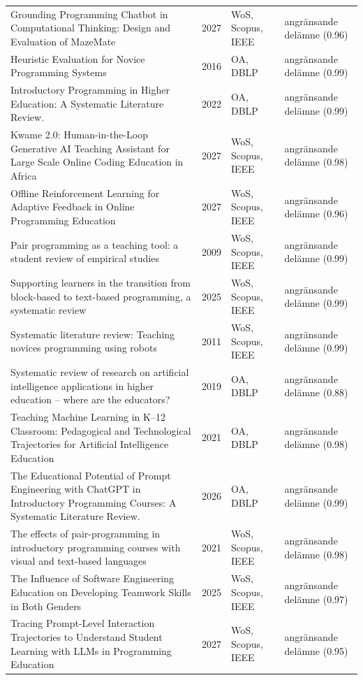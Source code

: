 \begin{longtable}{@{}%
  >{\raggedright\arraybackslash}p{}c%
  >{\raggedright\arraybackslash}p{}%
  >{\raggedright\arraybackslash}p{}@{}}
Grounding Programming Chatbot in Computational Thinking: Design and Evaluation of MazeMate & 2027 & WoS, Scopus, IEEE & angränsande delämne (0.96) \\
Heuristic Evaluation for Novice Programming Systems & 2016 & OA, DBLP & angränsande delämne (0.99) \\
Introductory Programming in Higher Education: A Systematic Literature Review. & 2022 & OA, DBLP & angränsande delämne (0.99) \\
Kwame 2.0: Human-in-the-Loop Generative AI Teaching Assistant for Large Scale Online Coding Education in Africa & 2027 & WoS, Scopus, IEEE & angränsande delämne (0.98) \\
Offline Reinforcement Learning for Adaptive Feedback in Online Programming Education & 2027 & WoS, Scopus, IEEE & angränsande delämne (0.96) \\
Pair programming as a teaching tool: a student review of empirical studies & 2009 & WoS, Scopus, IEEE & angränsande delämne (0.99) \\
Supporting learners in the transition from block-based to text-based programming, a systematic review & 2025 & WoS, Scopus, IEEE & angränsande delämne (0.99) \\
Systematic literature review: Teaching novices programming using robots & 2011 & WoS, Scopus, IEEE & angränsande delämne (0.99) \\
Systematic review of research on artificial intelligence applications in higher education -- where are the educators? & 2019 & OA, DBLP & angränsande delämne (0.88) \\
Teaching Machine Learning in K--12 Classroom: Pedagogical and Technological Trajectories for Artificial Intelligence Education & 2021 & OA, DBLP & angränsande delämne (0.98) \\
The Educational Potential of Prompt Engineering with ChatGPT in Introductory Programming Courses: A Systematic Literature Review. & 2026 & OA, DBLP & angränsande delämne (0.99) \\
The effects of pair-programming in introductory programming courses with visual and text-based languages & 2021 & WoS, Scopus, IEEE & angränsande delämne (0.98) \\
The Influence of Software Engineering Education on Developing Teamwork Skills in Both Genders & 2025 & WoS, Scopus, IEEE & angränsande delämne (0.97) \\
Tracing Prompt-Level Interaction Trajectories to Understand Student Learning with LLMs in Programming Education & 2027 & WoS, Scopus, IEEE & angränsande delämne (0.95) \\

\end{longtable}
